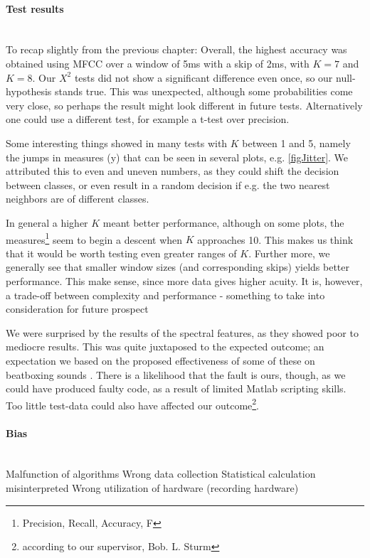 \paragraph{Test results} \hspace{0pt} \\

To recap slightly from the previous chapter: Overall, the highest accuracy was obtained using MFCC over a window of 5ms with a skip of 2ms, with $K=7$ and $K=8$. Our $X^2$ tests did not show a significant difference even once, so our null-hypothesis stands true. This was unexpected, although some probabilities come very close, so perhaps the result might look different in future tests. Alternatively one could use a different test, for example a t-test over precision.

Some interesting things showed in many tests with $K$ between 1 and 5, namely the jumps in measures (y) that can be seen in several plots, e.g. \ref{figJitter}. We attributed this to even and uneven numbers, as they could shift the decision between classes, or even result in a random decision if e.g. the two nearest neighbors are of different classes.

In general a higher $K$ meant better performance, although on some plots, the measures\footnote{Precision, Recall, Accuracy, F} seem to begin a descent when $K$ approaches 10. This makes us think that it would be worth testing even greater ranges of $K$. 
Further more, we generally see that smaller window sizes (and corresponding skips) yields better performance. This make sense, since more data gives higher acuity. It is, however, a trade-off between complexity and performance - something to take into consideration for future prospect

We were surprised by the results of the spectral features, as they showed poor to mediocre results. This was quite juxtaposed to the expected outcome; an expectation we based on the proposed effectiveness of some of these on beatboxing sounds \citep{Sinyor05}. There is a likelihood that the fault is ours, though, as we could have produced faulty code, as a result of limited Matlab scripting skills. Too little test-data could also have affected our outcome\footnote{according to our supervisor, Bob. L. Sturm}.





\paragraph{Bias} \hspace{0pt} \\
%
Malfunction of algorithms
Wrong data collection
Statistical calculation misinterpreted
Wrong utilization of hardware (recording hardware)

